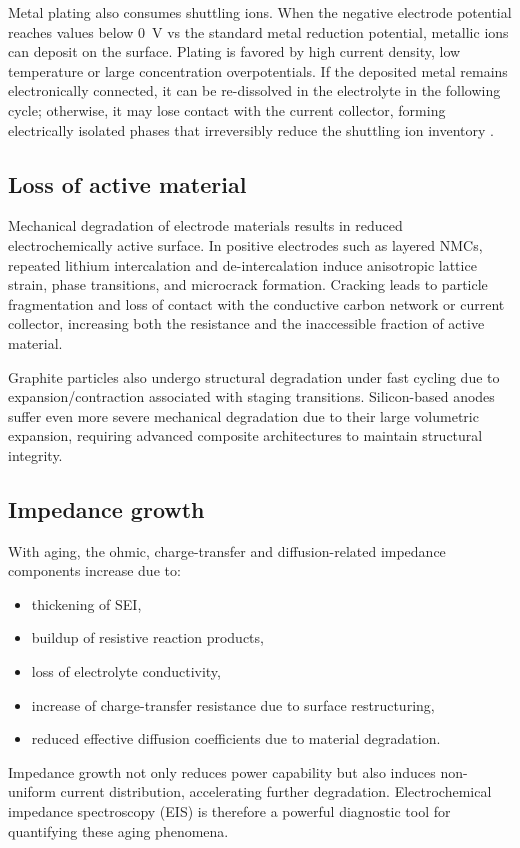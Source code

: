 Metal plating also consumes shuttling ions. When the negative electrode potential reaches values below 0~V vs the standard metal reduction potential, metallic ions can deposit on the surface. 
Plating is favored by high current density, low temperature or large concentration overpotentials. 
If the deposited metal remains electronically connected, it can be re-dissolved in the electrolyte in the following cycle; otherwise, it may lose contact with the current collector, forming electrically isolated phases that irreversibly reduce the shuttling ion inventory \cite{HSIEH2020100139}.

\subsection{Loss of active material}

Mechanical degradation of electrode materials results in reduced electrochemically active surface. 
In positive electrodes such as layered NMCs, repeated lithium intercalation and de-intercalation induce anisotropic lattice strain, phase transitions, and microcrack formation. 
Cracking leads to particle fragmentation and loss of contact with the conductive carbon network or current collector, increasing both the resistance and the inaccessible fraction of active material.

Graphite particles also undergo structural degradation under fast cycling due to expansion/contraction associated with staging transitions. Silicon-based anodes suffer even more severe mechanical degradation due to their large volumetric expansion, requiring advanced composite architectures to maintain structural integrity.

\subsection{Impedance growth}

With aging, the ohmic, charge-transfer and diffusion-related impedance components increase \cite{KIANI2023157638} due to:
\begin{itemize}
    \item thickening of SEI,
    \item buildup of resistive reaction products,
    \item loss of electrolyte conductivity,
    \item increase of charge-transfer resistance due to surface restructuring,
    \item reduced effective diffusion coefficients due to material degradation.
\end{itemize}
Impedance growth not only reduces power capability but also induces non-uniform current distribution, accelerating further degradation. Electrochemical impedance spectroscopy (EIS) is therefore a powerful diagnostic tool for quantifying these aging phenomena.

